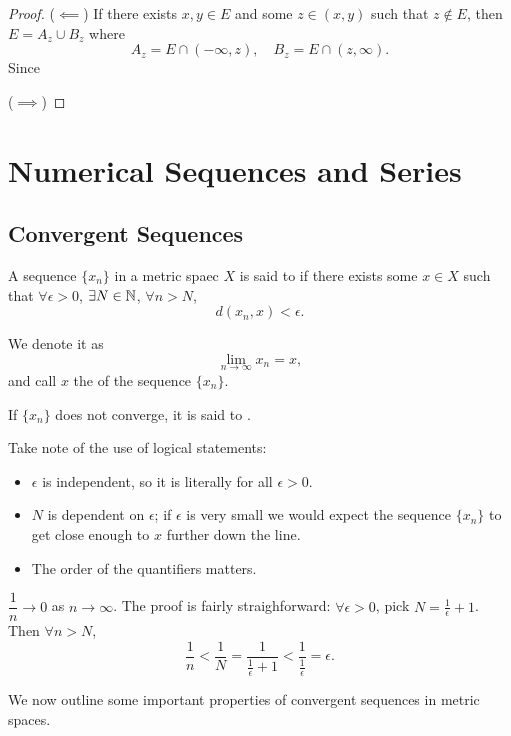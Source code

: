 \begin{proof}
($\impliedby$) If there exists $x,y\in E$ and some $z\in(x,y)$ such that $z\notin E$, then $E=A_z\cup B_z$ where
\[ A_z=E\cap(-\infty,z), \quad B_z=E\cap(z,\infty). \]
Since 

($\implies$) 
\end{proof}

\chapter{Numerical Sequences and Series}
\section{Convergent Sequences}
\begin{definition}
A sequence $\{x_n\}$ in a metric spaec $X$ is said to  if there exists some $x\in X$ such that $\forall\epsilon>0$, $\exists N\in\mathbb N$, $\forall n>N$, 
\[ d(x_n,x)<\epsilon. \]

We denote it as 
\[ \lim_{n\to\infty}x_n=x, \]
and call $x$ the  of the sequence $\{x_n\}$.

If $\{x_n\}$ does not converge, it is said to .
\end{definition}

\begin{remark}
Take note of the use of logical statements:
\begin{itemize}
\item $\epsilon$ is independent, so it is literally for all $\epsilon>0$.
\item $N$ is dependent on $\epsilon$; if $\epsilon$ is very small we would expect the sequence $\{x_n\}$ to get close enough to $x$ further down the line.
\item The order of the quantifiers matters.
\end{itemize}
\end{remark}

\begin{example}
$\dfrac{1}{n}\to 0$ as $n\to\infty$. The proof is fairly straighforward: $\forall\epsilon>0$, pick $N=\frac{1}{\epsilon}+1$. Then $\forall n>N$,
\[ \frac{1}{n}<\frac{1}{N}=\frac{1}{\frac{1}{\epsilon}+1}<\frac{1}{\frac{1}{\epsilon}}=\epsilon. \]
\end{example}

We now outline some important properties of convergent sequences in metric spaces.

